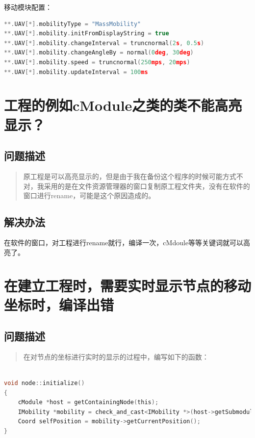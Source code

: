 移动模块配置：

\begin{lstlisting}[language=c]
**.UAV[*].mobilityType = "MassMobility"
**.UAV[*].mobility.initFromDisplayString = true
**.UAV[*].mobility.changeInterval = truncnormal(2s, 0.5s)
**.UAV[*].mobility.changeAngleBy = normal(0deg, 30deg)
**.UAV[*].mobility.speed = truncnormal(250mps, 20mps)
**.UAV[*].mobility.updateInterval = 100ms

\end{lstlisting}

\section{工程的例如cModule之类的类不能高亮显示？}
\label{工程的例如cmodule之类的类不能高亮显示？}

\subsection{问题描述}
\label{问题描述}

\begin{quote}
原工程是可以高亮显示的，但是由于我在备份这个程序的时候可能方式不对，我采用的是在文件资源管理器的窗口复制原工程文件夹，没有在软件的窗口进行rename，可能是这个原因造成的。
\end{quote}

\subsection{解决办法}
\label{解决办法}

在软件的窗口，对工程进行rename就行，编译一次，cMdoule等等关键词就可以高亮了。

\section{在建立工程时，需要实时显示节点的移动坐标时，编译出错}
\label{在建立工程时，需要实时显示节点的移动坐标时，编译出错}

\subsection{问题描述}
\label{问题描述}

\begin{quote}
在对节点的坐标进行实时的显示的过程中，编写如下的函数：
\end{quote}

\begin{lstlisting}[language=c]

void node::initialize()
{
    cModule *host = getContainingNode(this);
    IMobility *mobility = check_and_cast<IMobility *>(host->getSubmodule("mobility"));
    Coord selfPosition = mobility->getCurrentPosition();
}

\end{lstlisting}

